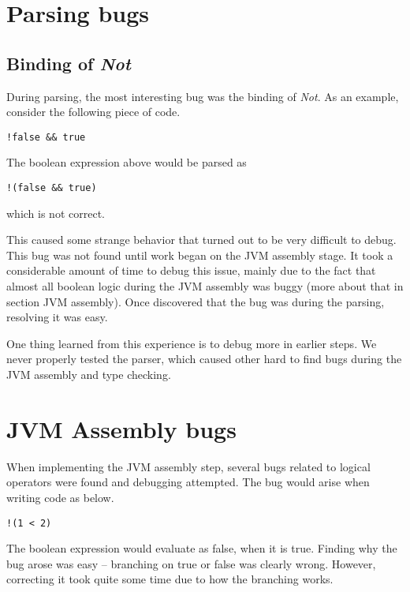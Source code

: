\documentclass[a4paper]{article}
\begin{document}
\appendix

\section{Parsing bugs}

\subsection{Binding of \textit{Not}}

During parsing, the most interesting bug was the binding of \textit{Not}. As an
example, consider the following piece of code.

\begin{lstlisting}
!false && true
\end{lstlisting}

The boolean expression above would be parsed as

\begin{lstlisting}
!(false && true)
\end{lstlisting}

which is not correct.

This caused some strange behavior that turned out to be very difficult to debug.
This bug was not found until work began on the JVM assembly stage. It took a
considerable amount of time to debug this issue, mainly due to the fact that
almost all boolean logic during the JVM assembly was buggy (more about that in
section JVM assembly). Once discovered that the bug was during the parsing,
resolving it was easy.

One thing learned from this experience is to debug more in earlier steps. We
never properly tested the parser, which caused other hard to find bugs during
the JVM assembly and type checking.

\section{JVM Assembly bugs}

When implementing the JVM assembly step, several bugs related to logical
operators were found and debugging attempted. The bug would arise when writing
code as below.

\begin{lstlisting}
!(1 < 2)
\end{lstlisting}

The boolean expression would evaluate as false, when it is true. Finding why the
bug arose was easy -- branching on true or false was clearly wrong. However,
correcting it took quite some time due to how the branching works.
\end{document}
